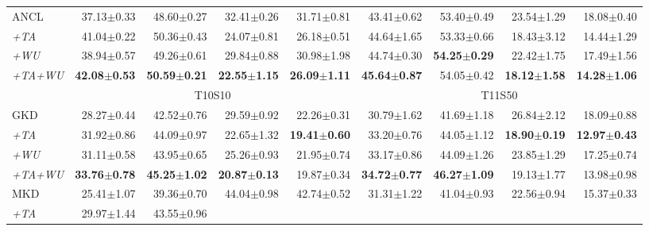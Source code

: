 \begin{appendix}
\begin{table*}[!th]
{\begin{tabular}{@{}lrrrrrrrr@{}}
  \midrule
  ANCL &
  37.13$\pm$0.33 & 48.60$\pm$0.27 & 32.41$\pm$0.26 & 31.71$\pm$0.81 & 43.41$\pm$0.62 & 53.40$\pm$0.49 & 23.54$\pm$1.29 & 18.08$\pm$0.40 \\
  \textit{+TA} &
  41.04$\pm$0.22 & 50.36$\pm$0.43 & 24.07$\pm$0.81 & 26.18$\pm$0.51 & 44.64$\pm$1.65 & 53.33$\pm$0.66 & 18.43$\pm$3.12 & 14.44$\pm$1.29 \\
  \textit{+WU} &
  38.94$\pm$0.57 & 49.26$\pm$0.61 & 29.84$\pm$0.88 & 30.98$\pm$1.98 & 44.74$\pm$0.30 & \textbf{54.25$\pm$0.29} & 22.42$\pm$1.75 & 17.49$\pm$1.56 \\
  \textit{+TA+WU} &
  \textbf{42.08$\pm$0.53} & \textbf{50.59$\pm$0.21} & \textbf{22.55$\pm$1.15} & \textbf{26.09$\pm$1.11} & \textbf{45.64$\pm$0.87} & 54.05$\pm$0.42 & \textbf{18.12$\pm$1.58} & \textbf{14.28$\pm$1.06} \\
  \midrule
 &
  \multicolumn{4}{c}{T10S10} &
  \multicolumn{4}{c}{T11S50} \\ 
 \midrule
GKD &
  28.27$\pm$0.44 &
  42.52$\pm$0.76 &
  29.59$\pm$0.92 &
  22.26$\pm$0.31 &
  30.79$\pm$1.62 &
  41.69$\pm$1.18 &
  26.84$\pm$2.12 &
  18.09$\pm$0.88 \\
\textit{+TA} &
  31.92$\pm$0.86 &
  44.09$\pm$0.97 &
  22.65$\pm$1.32 &
  \textbf{19.41$\pm$0.60} &
  33.20$\pm$0.76 &
  44.05$\pm$1.12 &
  \textbf{18.90$\pm$0.19} &
  \textbf{12.97$\pm$0.43} \\
\textit{+WU} &
  31.11$\pm$0.58 &
  43.95$\pm$0.65 &
  25.26$\pm$0.93 &
  21.95$\pm$0.74 &
  33.17$\pm$0.86 &
  44.09$\pm$1.26 &
  23.85$\pm$1.29 &
  17.25$\pm$0.74 \\
\textit{+TA+WU} &
  \textbf{33.76$\pm$0.78} &
  \textbf{45.25$\pm$1.02} &
  \textbf{20.87$\pm$0.13} &
  19.87$\pm$0.34 &
  \textbf{34.72$\pm$0.77} &
  \textbf{46.27$\pm$1.09} &
  19.13$\pm$1.77 &
  13.98$\pm$0.98 \\ \midrule
MKD &
  25.41$\pm$1.07 &
  39.36$\pm$0.70 &
  44.04$\pm$0.98 &
  42.74$\pm$0.52 &
  31.31$\pm$1.22 &
  41.04$\pm$0.93 &
  22.56$\pm$0.94 &
  15.37$\pm$0.33 \\
\textit{+TA} &
  29.97$\pm$1.44 &
  43.55$\pm$0.96 &

\end{tabular}}
\end{table*}
\end{appendix}
